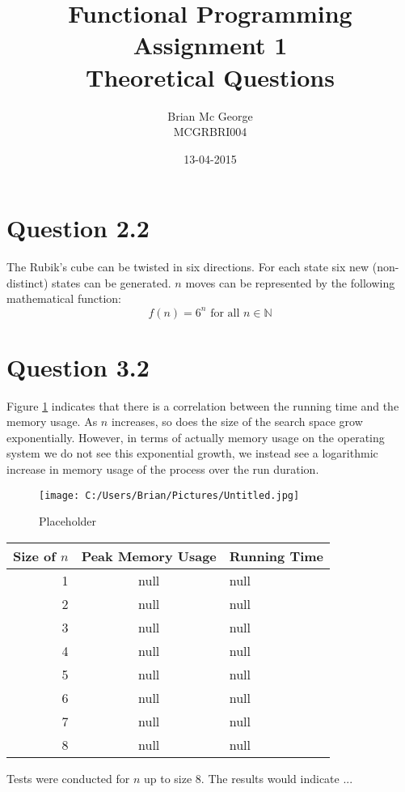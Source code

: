 \documentclass[]{article}
\title{Functional Programming Assignment 1\\Theoretical Questions}
\date{13-04-2015}
\author{Brian Mc George\\MCGRBRI004
}
\begin{document}
\maketitle
\newpage

\section*{Question 2.2}
The Rubik's cube can be twisted in six directions. For each state six new (non-distinct) states can be generated. \(n\) moves can be represented by the following mathematical function:\[f(n)=6^n\text{ for all }n \in\mathbb{N}\]

\section*{Question 3.2}
Figure \ref{fig:memory_usage} indicates that there is a correlation between the running time and the memory usage. As \(n\) increases, so does the size of the search space grow exponentially. However, in terms of actually memory usage on the operating system we do not see this exponential growth, we instead see a logarithmic increase in memory usage of the process over the run duration.
\begin{figure}[tbph]
\centering
\texttt{[image: C:/Users/Brian/Pictures/Untitled.jpg]}
\caption{Placeholder}
\label{fig:memory_usage}
\end{figure}
\begin{center}
\begin{tabular}{|r|c|l|}
\hline
Size of \(n\)&Peak Memory Usage&Running Time\\
\hline
1&null&null\\
2&null&null\\
3&null&null\\
4&null&null\\
5&null&null\\
6&null&null\\
7&null&null\\
8&null&null\\
\hline
\end{tabular}\end{center}
Tests were conducted for \(n\) up to size 8. The results would indicate ...
\end{document}
